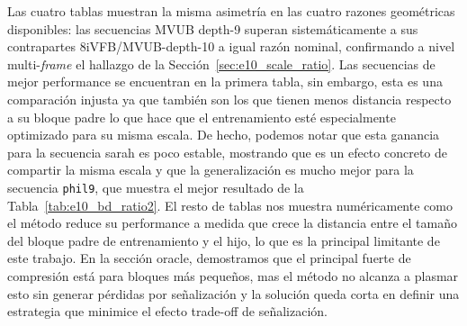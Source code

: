         Las cuatro tablas muestran la misma asimetría en las cuatro razones geométricas
        disponibles: las secuencias MVUB depth-9 superan sistemáticamente a sus contrapartes
        8iVFB/MVUB-depth-10 a igual razón nominal, confirmando a nivel multi-\textit{frame} el
        hallazgo de la Sección~\ref{sec:e10_scale_ratio}. Las secuencias de mejor performance se encuentran en la primera tabla, sin embargo, esta es una comparación injusta ya que también son los que tienen menos distancia respecto a su bloque padre lo que hace que el entrenamiento esté especialmente optimizado para su misma escala. De hecho, podemos notar que esta ganancia para la secuencia sarah es poco estable, mostrando que es un efecto concreto de compartir la misma escala y que la generalización es mucho mejor para la secuencia \texttt{phil9}, que muestra el mejor resultado de la Tabla~\ref{tab:e10_bd_ratio2}. El resto de tablas nos muestra numéricamente como el método reduce su performance a medida que crece la distancia entre el tamaño del bloque padre de entrenamiento y el hijo, lo que es la principal limitante de este trabajo. En la sección oracle, demostramos que el principal fuerte de compresión está para bloques más pequeños, mas el método no alcanza a plasmar esto sin generar pérdidas por señalización y la solución queda corta en definir una estrategia que minimice el efecto trade-off de señalización.

